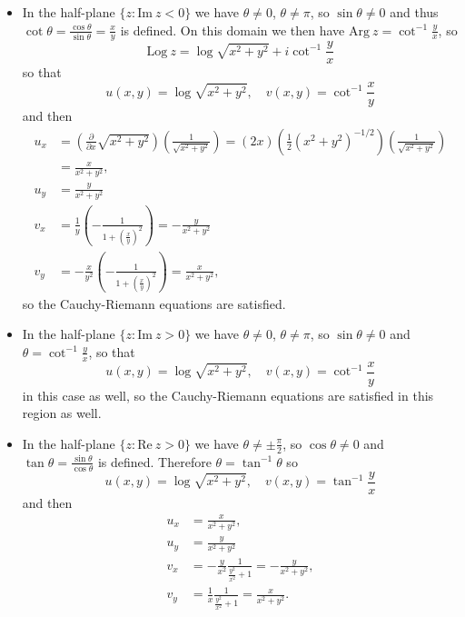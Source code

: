 \documentclass{article}
\begin{document}
\begin{Answer}
  \begin{itemize}
    \item{
      In the half-plane $\{ z : \mathrm{Im}~z < 0 \}$ we have
      $\theta \neq 0$, $\theta \neq \pi$, so $\sin \theta \neq 0$
      and thus
      $\cot \theta = \frac{\cos \theta}{\sin \theta} = \frac{x}{y}$ is defined.
      On this domain we then have $\mathrm{Arg}~z = \cot^{-1} \frac{y}{x}$, so
      $$
      \mathrm{Log}~z = \log \sqrt{x^2 + y^2} + i \cot^{-1} \frac{y}{x}
      $$
      so that
      $$
      u(x, y) = \log \sqrt{x^2 + y^2}, \quad
      v(x, y) = \cot^{-1} \frac{x}{y}
      $$
      and then
      \begin{align*}
      u_x &= \left(\frac{\partial}{\partial x} \sqrt{x^2 + y^2}\right)
             \left(\frac{1}{\sqrt{x^2 + y^2}}\right)
           = (2x)\left(\frac{1}{2}(x^2 + y^2)^{-1/2}\right)
             \left(\frac{1}{\sqrt{x^2 + y^2}}\right) \\
          &= \frac{x}{x^2 + y^2}, \\
      u_y &= \frac{y}{x^2 + y^2} \\
      v_x &= \frac{1}{y}\left(-\frac{1}{1 + \left(\frac{x}{y}\right)^2}\right)
           = -\frac{y}{x^2 + y^2} \\
      v_y &= -\frac{x}{y^2}\left(-\frac{1}{1 + \left(\frac{x}{y}\right)^2}\right)
           = \frac{x}{x^2 + y^2},
      \end{align*}
      so the Cauchy-Riemann equations are satisfied.
    }
    \item{
      In the half-plane $\{z : \mathrm{Im}~z > 0\}$ we have
      $\theta \neq 0$, $\theta \neq \pi$, so $\sin \theta \neq 0$ and
      $\theta = \cot^{-1} \frac{y}{x}$, so that
      $$
      u(x, y) = \log \sqrt{x^2 + y^2}, \quad
      v(x, y) = \cot^{-1} \frac{x}{y}
      $$
      in this case as well, so the Cauchy-Riemann
      equations are satisfied in this region as well.
    }
    \item{
      In the half-plane $\{z : \mathrm{Re}~z > 0\}$ we have
      $\theta \neq \pm \frac{\pi}{2}$, so $\cos \theta \neq 0$ and
      $\tan \theta = \frac{\sin \theta}{\cos \theta}$ is defined.
      Therefore $\theta = \tan^{-1} \theta$ so
      $$
      u(x, y) = \log \sqrt{x^2 + y^2}, \quad
      v(x, y) = \tan^{-1} \frac{y}{x}
      $$
      and then
      \begin{align*}
      u_x &= \frac{x}{x^2 + y^2}, \\
      u_y &= \frac{y}{x^2 + y^2} \\
      v_x &= -\frac{y}{x^2}\frac{1}{\frac{y^2}{x^2} + 1}
           = -\frac{y}{x^2 + y^2}, \\
      v_y &= \frac{1}{x}\frac{1}{\frac{y^2}{x^2} + 1}
           = \frac{x}{x^2 + y^2}.
      \end{align*}
    }
  \end{itemize}
\end{Answer}
\end{document}
